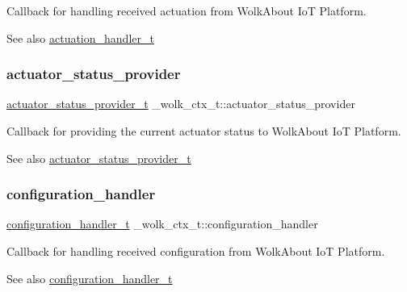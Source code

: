 Callback for handling received actuation from Wolk\+About IoT Platform. \begin{DoxySeeAlso}{See also}
\hyperlink{WolkConn_8h_acde87869e807b1774680f3f2b5b04e2f}{actuation\+\_\+handler\+\_\+t} 
\end{DoxySeeAlso}
\mbox{\label{struct__wolk__ctx__t_aadae34ca3e3d99ed0e124ffd610f1edd}} 
\subsubsection{\texorpdfstring{actuator\+\_\+status\+\_\+provider}{actuator\_status\_provider}}
{\footnotesize\ttfamily \hyperlink{WolkConn_8h_af3e8919a04a293972b64605557287537}{actuator\+\_\+status\+\_\+provider\+\_\+t} \+\_\+wolk\+\_\+ctx\+\_\+t\+::actuator\+\_\+status\+\_\+provider}

Callback for providing the current actuator status to Wolk\+About IoT Platform. \begin{DoxySeeAlso}{See also}
\hyperlink{WolkConn_8h_af3e8919a04a293972b64605557287537}{actuator\+\_\+status\+\_\+provider\+\_\+t} 
\end{DoxySeeAlso}
\mbox{\label{struct__wolk__ctx__t_a4d17880aa8086559923d94f678cecfbc}} 
\subsubsection{\texorpdfstring{configuration\+\_\+handler}{configuration\_handler}}
{\footnotesize\ttfamily \hyperlink{WolkConn_8h_a6662d0d41546795466cc2b398d8dcb08}{configuration\+\_\+handler\+\_\+t} \+\_\+wolk\+\_\+ctx\+\_\+t\+::configuration\+\_\+handler}

Callback for handling received configuration from Wolk\+About IoT Platform. \begin{DoxySeeAlso}{See also}
\hyperlink{WolkConn_8h_a6662d0d41546795466cc2b398d8dcb08}{configuration\+\_\+handler\+\_\+t} 
\end{DoxySeeAlso}
\mbox{\label{struct__wolk__ctx__t_a4b2c98179054515e4288812f21bff3a4}} 
